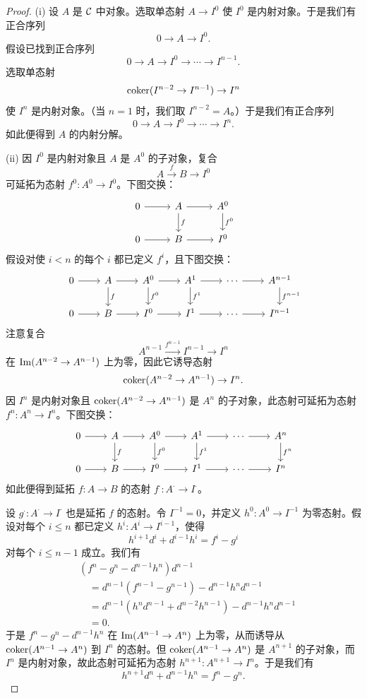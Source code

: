 \begin{proof}
(i) 设 $A$ 是 $\mathcal{C}$ 中对象。选取单态射 $A\to I^0$ 使 $I^0$ 是内射对象。于是我们有正合序列
\[
0\to A\to I^0.
\]
假设已找到正合序列
\[
0\to A\to I^0\to\cdots\to I^{n-1}.
\]
选取单态射
\[
\operatorname{coker}(I^{n-2}\to I^{n-1})\to I^n
\]
使 $I^n$ 是内射对象。（当 $n=1$ 时，我们取 $I^{n-2}=A$。）于是我们有正合序列
\[
0\to A\to I^0\to\cdots\to I^n.
\]
如此便得到 $A$ 的内射分解。

(ii) 因 $I^0$ 是内射对象且 $A$ 是 $A^0$ 的子对象，复合
\[
A\xrightarrow{f}B\to I^0
\]
可延拓为态射 $f^0\colon A^0\to I^0$。下图交换：
\[\begin{tikzcd}[column sep=2.6em,row sep=1.8em]
0 \arrow[r] & A \arrow[r] \arrow[d,"f"] & A^0 \arrow[d,"f^0"] \\
0 \arrow[r] & B \arrow[r] & I^0
\end{tikzcd}\]
假设对使 $i<n$ 的每个 $i$ 都已定义 $f^i$，且下图交换：
\[\begin{tikzcd}[column sep=2.2em,row sep=1.8em]
0 \arrow[r] & A \arrow[r] \arrow[d,"f"] & A^0 \arrow[r] \arrow[d,"f^0"] & A^1 \arrow[r] \arrow[d,"f^1"] & \cdots \arrow[r] & A^{n-1} \arrow[d,"f^{n-1}"] \\
0 \arrow[r] & B \arrow[r] & I^0 \arrow[r] & I^1 \arrow[r] & \cdots \arrow[r] & I^{n-1}
\end{tikzcd}\]
注意复合
\[
A^{n-1}\xrightarrow{f^{n-1}}I^{n-1}\to I^n
\]
在 $\operatorname{Im}(A^{n-2}\to A^{n-1})$ 上为零，因此它诱导态射
\[
\operatorname{coker}(A^{n-2}\to A^{n-1})\to I^n.
\]
因 $I^n$ 是内射对象且 $\operatorname{coker}(A^{n-2}\to A^{n-1})$ 是 $A^n$ 的子对象，此态射可延拓为态射 $f^n\colon A^n\to I^n$。下图交换：
\[\begin{tikzcd}[column sep=2.2em,row sep=1.8em]
0 \arrow[r] & A \arrow[r] \arrow[d,"f"] & A^0 \arrow[r] \arrow[d,"f^0"] & A^1 \arrow[r] \arrow[d,"f^1"] & \cdots \arrow[r] & A^n \arrow[d,"f^n"] \\
0 \arrow[r] & B \arrow[r] & I^0 \arrow[r] & I^1 \arrow[r] & \cdots \arrow[r] & I^n
\end{tikzcd}\]
如此便得到延拓 $f\colon A\to B$ 的态射 $f^\cdot\colon A^\cdot\to I^\cdot$。

设 $g^\cdot\colon A^\cdot\to I^\cdot$ 也是延拓 $f$ 的态射。令 $I^{-1}=0$，并定义 $h^0\colon A^0\to I^{-1}$ 为零态射。假设对每个 $i\le n$ 都已定义 $h^i\colon A^i\to I^{i-1}$，使得
\[
h^{i+1}d^i+d^{i-1}h^i=f^i-g^i
\]
对每个 $i\le n-1$ 成立。我们有
\[
\begin{aligned}
&(f^n-g^n-d^{n-1}h^n)d^{n-1}\\
&\quad=d^{n-1}(f^{n-1}-g^{n-1})-d^{n-1}h^n d^{n-1}\\
&\quad=d^{n-1}(h^n d^{n-1}+d^{n-2}h^{n-1})-d^{n-1}h^n d^{n-1}\\
&\quad=0.
\end{aligned}
\]
于是 $f^n-g^n-d^{n-1}h^n$ 在 $\operatorname{Im}(A^{n-1}\to A^n)$ 上为零，从而诱导从 $\operatorname{coker}(A^{n-1}\to A^n)$ 到 $I^n$ 的态射。但 $\operatorname{coker}(A^{n-1}\to A^n)$ 是 $A^{n+1}$ 的子对象，而 $I^n$ 是内射对象，故此态射可延拓为态射 $h^{n+1}\colon A^{n+1}\to I^n$。于是我们有
\[
h^{n+1}d^n+d^{n-1}h^n=f^n-g^n.
\]


\end{proof}
